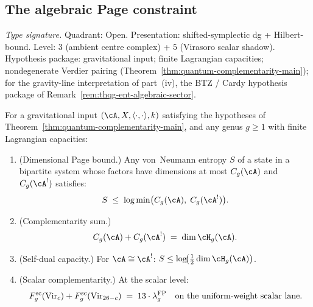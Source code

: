 %
%

\subsection{The algebraic Page constraint}
\label{subsec:thqg-entanglement-page}

\begin{theorem}
\label{thm:thqg-page-constraint}
\textit{Type signature.}
Quadrant: Open. Presentation: shifted-symplectic dg + Hilbert-bound.
Level: $3$ (ambient centre complex) + $5$ (Virasoro scalar shadow).
Hypothesis package: gravitational input; finite Lagrangian capacities;
nondegenerate Verdier pairing
\textup{(}Theorem~\ref{thm:quantum-complementarity-main}\textup{)};
for the gravity-line interpretation of part~\textup{(iv)}, the
BTZ / Cardy hypothesis package of
Remark~\ref{rem:thqg-ent-algebraic-sector}.

\medskip
For a gravitational input $(\cA, X, \langle \cdot, \cdot \rangle, k)$
satisfying the hypotheses of
Theorem~\ref{thm:quantum-complementarity-main}, and any genus
$g \ge 1$ with finite Lagrangian capacities:
\begin{enumerate}[label=\textup{(\roman*)}]
\item \textup{(Dimensional Page bound.)}
 Any von~Neumann entropy $S$ of a state in a bipartite system
 whose factors have dimensions at most $C_g(\cA)$ and $C_g(\cA^!)$
 satisfies:
 \begin{equation}\label{eq:thqg-page-bound}
 S
 \;\le\;
 \log\min\bigl(C_g(\cA),\; C_g(\cA^!)\bigr).
 \end{equation}

\item \textup{(Complementarity sum.)}
 \begin{equation}\label{eq:thqg-page-complementarity}
 C_g(\cA) + C_g(\cA^!)
 \;=\;
 \dim \cH_g(\cA).
 \end{equation}

\item \textup{(Self-dual capacity.)}
 For $\cA \cong \cA^!$:
 $S \le \log\!\bigl(\tfrac{1}{2}\dim \cH_g(\cA)\bigr)$.

\item \textup{(Scalar complementarity.)}
 At the scalar level:
 \begin{equation}\label{eq:thqg-page-virasoro-scalar}
 F_g^{\mathrm{sc}}(\mathrm{Vir}_c)
 + F_g^{\mathrm{sc}}(\mathrm{Vir}_{26-c})
 \;=\;
 13 \cdot \lambda_g^{\mathrm{FP}}
 \quad\textup{on the uniform-weight scalar lane}.
 \end{equation}
\end{enumerate}
\end{theorem}


